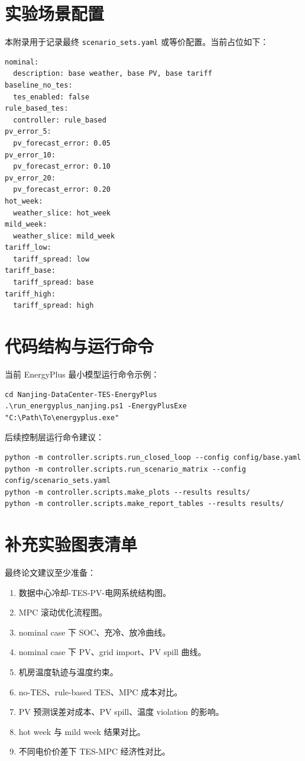 \documentclass[UTF8,a4paper,12pt]{ctexrep}
\begin{document}
\chapter{实验场景配置}

本附录用于记录最终 \texttt{scenario\_sets.yaml} 或等价配置。当前占位如下：

\begin{verbatim}
nominal:
  description: base weather, base PV, base tariff
baseline_no_tes:
  tes_enabled: false
rule_based_tes:
  controller: rule_based
pv_error_5:
  pv_forecast_error: 0.05
pv_error_10:
  pv_forecast_error: 0.10
pv_error_20:
  pv_forecast_error: 0.20
hot_week:
  weather_slice: hot_week
mild_week:
  weather_slice: mild_week
tariff_low:
  tariff_spread: low
tariff_base:
  tariff_spread: base
tariff_high:
  tariff_spread: high
\end{verbatim}

\chapter{代码结构与运行命令}

当前 EnergyPlus 最小模型运行命令示例：

\begin{verbatim}
cd Nanjing-DataCenter-TES-EnergyPlus
.\run_energyplus_nanjing.ps1 -EnergyPlusExe "C:\Path\To\energyplus.exe"
\end{verbatim}

后续控制层运行命令建议：

\begin{verbatim}
python -m controller.scripts.run_closed_loop --config config/base.yaml
python -m controller.scripts.run_scenario_matrix --config config/scenario_sets.yaml
python -m controller.scripts.make_plots --results results/
python -m controller.scripts.make_report_tables --results results/
\end{verbatim}

\chapter{补充实验图表清单}

最终论文建议至少准备：

\begin{enumerate}[label=(\arabic*)]
  \item 数据中心冷却-TES-PV-电网系统结构图。
  \item MPC 滚动优化流程图。
  \item nominal case 下 SOC、充冷、放冷曲线。
  \item nominal case 下 PV、grid import、PV spill 曲线。
  \item 机房温度轨迹与温度约束。
  \item no-TES、rule-based TES、MPC 成本对比。
  \item PV 预测误差对成本、PV spill、温度 violation 的影响。
  \item hot week 与 mild week 结果对比。
  \item 不同电价价差下 TES-MPC 经济性对比。
\end{enumerate}
\end{document}
